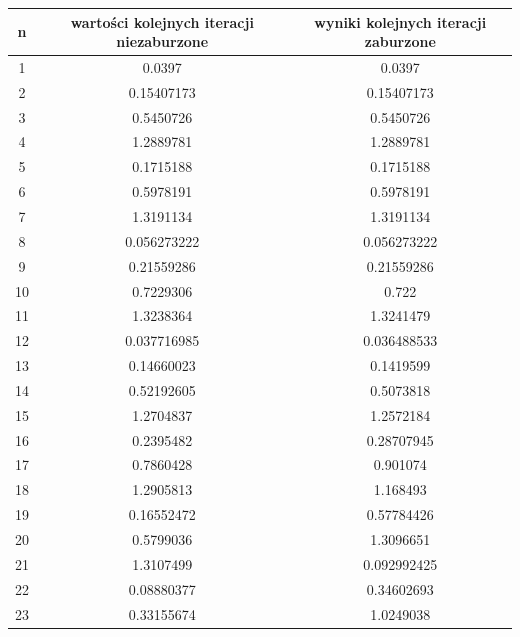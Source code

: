 \documentclass{article}
\begin{document}
\begin{table}[H]
\centering
\begin{tabular}{|c|c|c|}
\hline
\textbf{n} & wartości kolejnych iteracji niezaburzone        & wyniki kolejnych iteracji zaburzone        \\ \hline
1          & 0.0397            & 0.0397            \\ \hline
2          & 0.15407173        & 0.15407173        \\ \hline
3          & 0.5450726         & 0.5450726         \\ \hline
4          & 1.2889781         & 1.2889781         \\ \hline
5          & 0.1715188         & 0.1715188         \\ \hline
6          & 0.5978191         & 0.5978191         \\ \hline
7          & 1.3191134         & 1.3191134         \\ \hline
8          & 0.056273222       & 0.056273222       \\ \hline
9          & 0.21559286        & 0.21559286        \\ \hline
10         & 0.7229306         & 0.722             \\ \hline
11         & 1.3238364         & 1.3241479         \\ \hline
12         & 0.037716985       & 0.036488533       \\ \hline
13         & 0.14660023        & 0.1419599         \\ \hline
14         & 0.52192605        & 0.5073818         \\ \hline
15         & 1.2704837         & 1.2572184         \\ \hline
16         & 0.2395482         & 0.28707945        \\ \hline
17         & 0.7860428         & 0.901074          \\ \hline
18         & 1.2905813         & 1.168493          \\ \hline
19         & 0.16552472        & 0.57784426        \\ \hline
20         & 0.5799036         & 1.3096651         \\ \hline
21         & 1.3107499         & 0.092992425       \\ \hline
22         & 0.08880377        & 0.34602693        \\ \hline
23         & 0.33155674        & 1.0249038         \\ \hline

\end{tabular}
\end{table}
\end{document}
